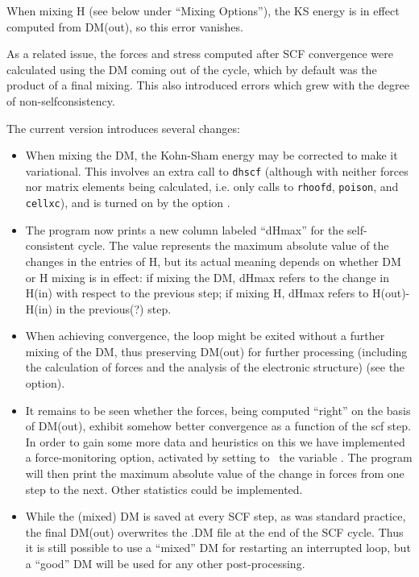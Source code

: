 When mixing H (see below under ``Mixing Options''), the KS energy is
in effect computed from DM(out), so this error vanishes.

As a related issue, the forces and stress computed after SCF
convergence were calculated using the DM coming out of the cycle,
which by default was the product of a final mixing. This also
introduced errors which grew with the degree of non-selfconsistency.

The current version introduces several changes:

\begin{itemize}
\item When mixing the DM, the Kohn-Sham energy may be corrected to make it
  variational. This involves an extra call to \texttt{dhscf} (although
  with neither forces nor matrix elements being calculated, i.e. only
  calls to \texttt{rhoofd}, \texttt{poison}, and \texttt{cellxc}), and is
  turned on by the option .


\item The program now prints a new column labeled ``dHmax'' for the
  self-consistent cycle. The value represents the maximum absolute
  value of the changes in the entries of H, but its actual meaning
  depends on whether DM or H mixing is in effect: if mixing the DM,
  dHmax refers to the change in H(in) with respect to the previous
  step; if mixing H, dHmax refers to H(out)-H(in) in the previous(?)
  step.

  \item When achieving convergence, the loop might be exited without a
  further mixing of the DM, thus preserving DM(out) for further
  processing (including the calculation of forces and the analysis of
  the electronic structure) (see the 
  option).


  \item It remains to be seen whether the forces, being computed
  ``right'' on the basis of DM(out), exhibit somehow better
  convergence as a function of the scf step. In order to gain some
  more data and heuristics on this we have implemented a
  force-monitoring option, activated by setting to \fdftrue\ the
  variable . The program will then print the
  maximum absolute value of the change in forces from one step to the
  next. Other statistics could be implemented.

  \item While the (mixed) DM is saved at every SCF step, as was
  standard practice, the final DM(out) overwrites the .DM file at the
  end of the SCF cycle. Thus it is still possible to use a ``mixed''
  DM for restarting an interrupted loop, but a ``good'' DM will be
  used for any other post-processing.


\end{itemize}


